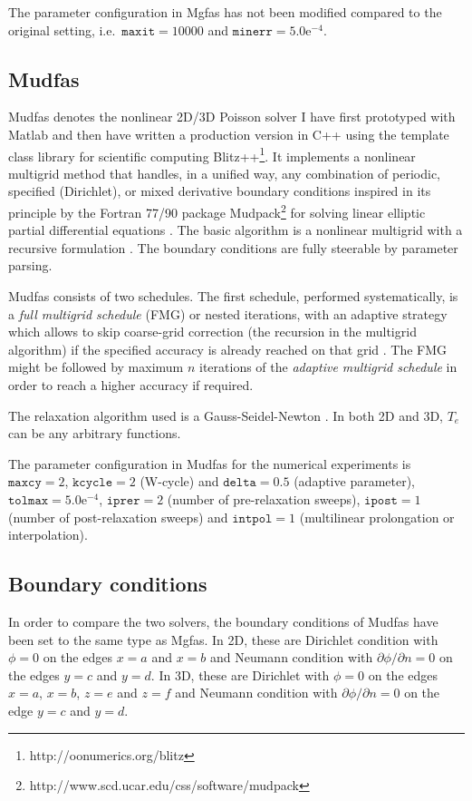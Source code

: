 \documentclass[10pt,a4paper]{article}
\newcommand*{\matlab}{\textsf{Matlab}\xspace}
\newcommand*{\mgfas}{\textsf{Mgfas}\xspace}
\newcommand*{\mudpack}{\textsf{Mudpack}\xspace}
\newcommand*{\mudfas}{\textsf{Mudfas}\xspace}
\begin{document}
The parameter configuration in \mgfas has not been modified compared to the
original setting, i.e.\ $\texttt{maxit}\!=\!10000$ and
$\texttt{minerr}\!=\!5.0\mbox{e}^{-4}$.


\subsection{\mudfas}
\mudfas denotes the nonlinear 2D/3D Poisson solver I have first prototyped 
with \matlab and then have written a production version in C++
using the template class library for scientific computing
Blitz++\footnote{http://oonumerics.org/blitz}. It implements a nonlinear
multigrid method that handles, in a unified way, any combination of
periodic, specified (Dirichlet), or mixed derivative boundary conditions
inspired in its principle by the Fortran 77/90 package
\mudpack\footnote{http://www.scd.ucar.edu/css/software/mudpack} for
solving linear elliptic partial differential equations \citep{adams:1989}.  
The basic algorithm is a nonlinear multigrid with a recursive formulation
\citep{wesseling:1991}. 
The boundary conditions are fully steerable by parameter parsing.

\mudfas consists of two schedules. The first schedule, performed
systematically, is a \emph{full multigrid schedule} (FMG) or nested iterations,
with an adaptive strategy which allows to skip coarse-grid correction (the
recursion in the multigrid algorithm) if the specified accuracy is already
reached on that grid \citep{wesseling:1991}. The FMG might be followed 
by maximum $n$ iterations of the \emph{adaptive multigrid schedule} in order
to reach a higher accuracy if required. 

The relaxation algorithm used is a Gauss-Seidel-Newton \citep{press:1992}.
In both 2D and 3D, $T_e$ can be
any arbitrary functions.

The parameter configuration in \mudfas for the numerical experiments is
$\texttt{maxcy}\!=\!2$, $\texttt{kcycle}\!=\!2$ (W-cycle) and 
$\texttt{delta}\!=\!0.5$ (adaptive parameter), 
$\texttt{tolmax}\!=\!5.0\mbox{e}^{-4}$,
$\texttt{iprer}\!=\!2$ (number of pre-relaxation sweeps),
$\texttt{ipost}\!=\!1$ (number of post-relaxation sweeps) and
$\texttt{intpol}\!=\!1$ (multilinear prolongation or interpolation).

\subsection{Boundary conditions}

In order to compare the two solvers, the boundary conditions of \mudfas
have been set to the same type as \mgfas.  
In 2D, these are Dirichlet condition with $\phi=0$ on the edges $x=a$
and $x=b$ and Neumann condition with $\partial\phi/\partial n=0$ on the
edges $y=c$ and $y=d$. 
In 3D, these are Dirichlet with $\phi=0$ on the edges $x=a$, $x=b$, $z=e$ 
and $z=f$ and Neumann condition with $\partial\phi/\partial n=0$ on the edge
$y=c$ and $y=d$. 
\end{document}
